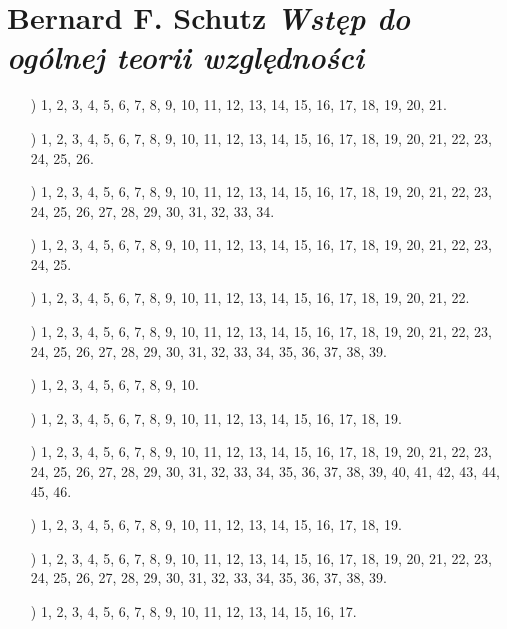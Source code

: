 \documentclass[a4paper,11pt]{article}
\numberwithin{equation}{section}
\begin{document}
\section{Bernard F. Schutz \textit{Wstęp do ogólnej teorii
    względności}}

\label{sec:Oznaczenia-i-konwencje}


\begin{itemize}

\item[\romannumeral1)] 1, 2, 3, 4, 5, 6, 7, 8, 9, 10, 11, 12, 13, 14, 15,
  16, 17, 18, 19, 20, 21.

\item[\romannumeral2)] 1, 2, 3, 4, 5, 6, 7, 8, 9, 10, 11, 12, 13, 14, 15,
  16, 17, 18, 19, 20, 21, 22, 23, 24, 25, 26.

\item[\romannumeral3)] 1, 2, 3, 4, 5, 6, 7, 8, 9, 10, 11, 12, 13, 14, 15,
  16, 17, 18, 19, 20, 21, 22, 23, 24, 25, 26, 27, 28, 29, 30, 31, 32, 33,
  34.

\item[\romannumeral4)] 1, 2, 3, 4, 5, 6, 7, 8, 9, 10, 11, 12, 13, 14, 15,
  16, 17, 18, 19, 20, 21, 22, 23, 24, 25.

\item[\romannumeral5)] 1, 2, 3, 4, 5, 6, 7, 8, 9, 10, 11, 12, 13, 14, 15,
  16, 17, 18, 19, 20, 21, 22.

\item[\romannumeral6)] 1, 2, 3, 4, 5, 6, 7, 8, 9, 10, 11, 12, 13, 14, 15,
  16, 17, 18, 19, 20, 21, 22, 23, 24, 25, 26, 27, 28, 29, 30, 31, 32, 33,
  34, 35, 36, 37, 38, 39.

\item[\romannumeral7)] 1, 2, 3, 4, 5, 6, 7, 8, 9, 10.

\item[\romannumeral8)] 1, 2, 3, 4, 5, 6, 7, 8, 9, 10, 11, 12, 13, 14, 15,
  16, 17, 18, 19.

\item[\romannumeral9)] 1, 2, 3, 4, 5, 6, 7, 8, 9, 10, 11, 12, 13, 14, 15,
  16, 17, 18, 19, 20, 21, 22, 23, 24, 25, 26, 27, 28, 29, 30, 31, 32, 33,
  34, 35, 36, 37, 38, 39, 40, 41, 42, 43, 44, 45, 46.

\item[\romannumeral10)] 1, 2, 3, 4, 5, 6, 7, 8, 9, 10, 11, 12, 13, 14, 15,
  16, 17, 18, 19.

\item[\romannumeral11)] 1, 2, 3, 4, 5, 6, 7, 8, 9, 10, 11, 12, 13, 14, 15,
  16, 17, 18, 19, 20, 21, 22, 23, 24, 25, 26, 27, 28, 29, 30, 31, 32, 33,
  34, 35, 36, 37, 38, 39.

\item[\romannumeral12)] 1, 2, 3, 4, 5, 6, 7, 8, 9, 10, 11, 12, 13, 14, 15,
  16, 17.

\end{itemize}
\end{document}
